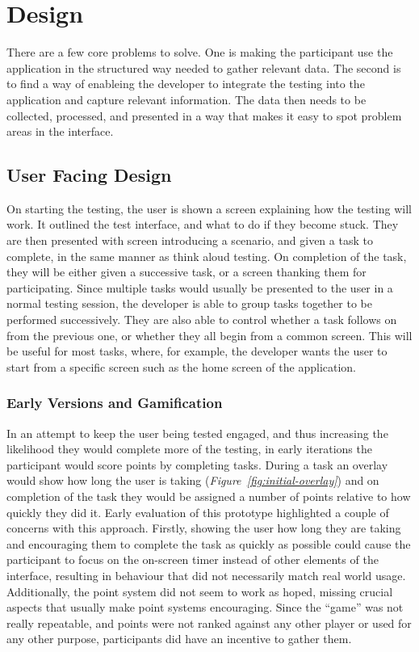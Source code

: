 \chapter{Design}

There are a few core problems to solve.
One is making the participant use the application in the structured way needed to
gather relevant data. The second is to find a way of enableing the developer to integrate
the testing into the application and capture relevant information. The data then needs
to be collected, processed, and presented in a way that makes it easy to spot
problem areas in the interface.

\section{User Facing Design}

On starting the testing, the user is shown a screen explaining how the testing
will work. It outlined the test interface, and what to do if they become stuck.
They are then presented with screen introducing a scenario, and given a task to 
complete, in the same manner as think aloud testing. On
completion of the task, they will be either given a successive task, or a screen
thanking them for participating. Since multiple tasks would usually be presented to the user in a normal testing session, the developer is able to group tasks together to be performed successively. They are also able to control whether a task follows on from the previous one, or whether they all begin from a common screen. This will be useful for most tasks, where, for example, the developer wants the user to start from a specific screen such as the home screen of the application.

\subsection{Early Versions and Gamification}

In an attempt to keep the user being tested engaged, and thus increasing the likelihood they would complete more of the testing, in early iterations the participant would score points by completing tasks. During a task an overlay would show how long the user is taking (\emph{Figure~\ref{fig:initial-overlay}}) and on completion of the task
they would be assigned a number of points relative to how quickly they did it.
Early evaluation of this prototype highlighted a couple of concerns with this approach. Firstly, showing the user how
long they are taking and encouraging them to complete the task as quickly as
possible could cause the participant to focus on the on-screen timer instead of other elements of the interface, resulting in behaviour that did not necessarily match real world usage.
Additionally, the point system did not seem to work as hoped, missing crucial aspects that usually make point systems encouraging.  Since the ``game'' was not really repeatable, and points were not ranked against any other player or used for any other purpose, participants did have an incentive to gather them. 

